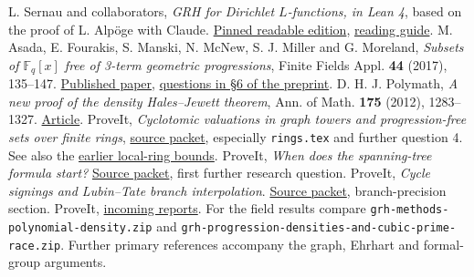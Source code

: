 \documentclass[11pt,letterpaper]{article}
\newcommand{\prev}[3]{\href{https://github.com/VladimirReshetnikov/ProveIt/blob/#1/docs/incoming/#2}{#3}}
\begin{document}
\begin{thebibliography}{9}\small
{} L. Sernau and collaborators, \emph{GRH for Dirichlet $L$-functions, in Lean 4}, based on the proof of L. Alpöge with Claude. \href{https://github.com/lsernau/grh-lean/tree/72fead102f663d5c7a407964a13dc0cf9d977207/grh}{Pinned readable edition}, \href{https://github.com/lsernau/grh-lean/blob/72fead102f663d5c7a407964a13dc0cf9d977207/grh/GUIDE.md}{reading guide}.
 M. Asada, E. Fourakis, S. Manski, N. McNew, S. J. Miller and G. Moreland, \emph{Subsets of $\mathbb F_q[x]$ free of 3-term geometric progressions}, Finite Fields Appl. \textbf{44} (2017), 135--147. \href{https://doi.org/10.1016/j.ffa.2016.10.002}{Published paper}, \href{https://arxiv.org/pdf/1512.01932}{questions in \S6 of the preprint}.
 D. H. J. Polymath, \emph{A new proof of the density Hales--Jewett theorem}, Ann. of Math. \textbf{175} (2012), 1283--1327. \href{https://doi.org/10.4007/annals.2012.175.3.6}{Article}.
 ProveIt, \emph{Cyclotomic valuations in graph towers and progression-free sets over finite rings}, \prev{1667e16cee9d4a68961e201e7288b8ecdac895c6}{grh_method_transfers_graph_towers_and_finite_rings.zip}{source packet}, especially \texttt{rings.tex} and further question 4. See also the \prev{5ed40f562710fcc2770bbb463dba528a6727f7ae}{grh_method_transfers_research.zip}{earlier local-ring bounds}.
 ProveIt, \emph{When does the spanning-tree formula start?} \prev{bd8864aa31430944f587f544213d562665f1d817}{Effective_Graph_Towers.zip}{Source packet}, first further research question.
 ProveIt, \emph{Cycle signings and Lubin--Tate branch interpolation}. \prev{5cc267af75a635199ac5d93a7d49cbce521daefc}{grh_transfers_cycle_signings_and_lubin_tate.zip}{Source packet}, branch-precision section.
 ProveIt, \href{https://github.com/VladimirReshetnikov/ProveIt/tree/main/docs/incoming}{incoming reports}. For the field results compare \texttt{grh-methods-polynomial-density.zip} and \texttt{grh-progression-densities-and-cubic-prime-race.zip}. Further primary references accompany the graph, Ehrhart and formal-group arguments.
\end{thebibliography}
\end{document}
